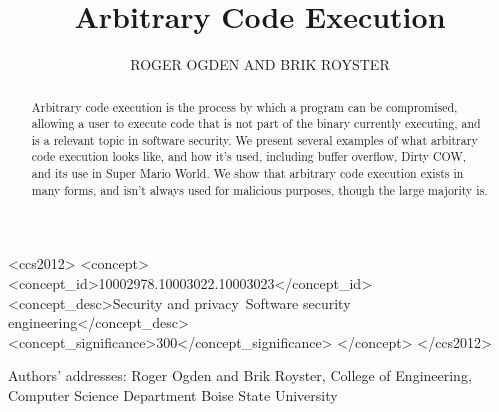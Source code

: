 \documentclass{acmsmall}
\begin{document}

\title{Arbitrary Code Execution}
\author{ROGER OGDEN AND BRIK ROYSTER}

\begin{abstract}
Arbitrary code execution is the process by which a program can be compromised, allowing a user to execute code that is not part of the binary currently executing, and is a relevant topic in software security. We present several examples of what arbitrary code execution looks like, and how it's used, including buffer overflow, Dirty COW, and its use in Super Mario World. We show that arbitrary code execution exists in many forms, and isn't always used for malicious purposes, though the large majority is.
\end{abstract}

%
%
\begin{CCSXML}
<ccs2012>
<concept>
<concept_id>10002978.10003022.10003023</concept_id>
<concept_desc>Security and privacy~Software security engineering</concept_desc>
<concept_significance>300</concept_significance>
</concept>
</ccs2012>
\end{CCSXML}


%
%




\begin{bottomstuff}
Authors' addresses: Roger Ogden and Brik Royster,
College of Engineering, Computer Science Department
Boise State University
\end{bottomstuff}

\maketitle











\nocite{*}


\end{document}

